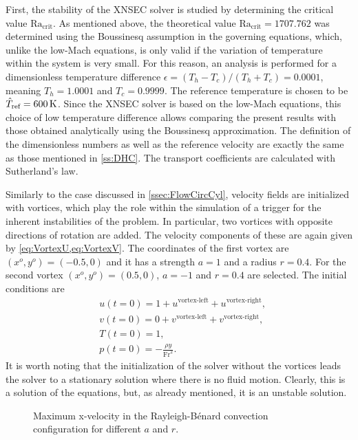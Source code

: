 First, the stability of the XNSEC solver is studied by determining the critical value $\text{Ra}_{\text{crit}}$. As mentioned above, the theoretical value $\text{Ra}_{\text{crit}} = 1707.762$ was determined using the Boussinesq  assumption in the governing equations, which, unlike the low-Mach equations, is only valid if the variation of temperature within the system is very small. For this reason, an analysis is performed for a dimensionless temperature difference $\epsilon = (T_h-T_c)/(T_h+T_c) = 0.0001$, meaning $T_h =1.0001$ and $T_c = 0.9999$. The reference temperature is chosen to be $\hat T_{\text{ref}} = \SI{600}{\kelvin}$. Since the XNSEC solver is based on the low-Mach equations, this choice of low temperature difference allows comparing the present results with those obtained analytically using the Boussinesq approximation. The definition of the dimensionless numbers as well as the reference velocity are exactly the same as those mentioned in \cref{ss:DHC}. The transport coefficients are calculated with Sutherland's law.

Similarly to the case discussed in \cref{ssec:FlowCircCyl}, velocity fields are initialized with vortices, which play the role within the simulation of a trigger for the inherent instabilities of the problem. In particular, two vortices with opposite directions of rotation are added. The velocity components of these are again given by \cref{eq:VortexU,eq:VortexV}. The coordinates of the first vortex are $(x^o,y^o) = (-0.5,0)$ and it has a strength $a = 1$ and a radius $r=0.4$. For the second vortex $(x^o,y^o) = (0.5,0)$, $a = -1$ and $r=0.4$ are selected. The initial conditions are
\begin{subequations} 
	\begin{align}
		&u(t=0) = 1 + u^{\text{vortex-left}} + u^{\text{vortex-right}},  \\
		&v(t=0) = 0 + v^{\text{vortex-left}}+ v^{\text{vortex-right}},  \\
		&T(t=0) = 1,\\
		&p(t=0) = -\frac{\rho y}{\text{Fr}^2}.
	\end{align}
\end{subequations}
It is worth noting that the initialization of the solver without the vortices leads the solver to a stationary solution where there is no fluid motion. Clearly, this is a solution of the equations, but, as already mentioned, it is an unstable solution.
\begin{figure}[bt]
	\centering
	\pgfplotsset{width=0.29\textwidth, compat=1.3}
	\hspace{0.2cm}
	\caption{Maximum x-velocity in the Rayleigh-Bénard convection configuration for different $a$ and $r$.}
	\label{fig:RayBerMaxVel}
\end{figure}


